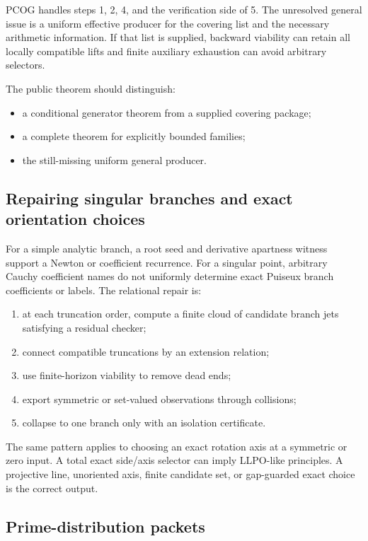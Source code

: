 PCOG handles steps 1, 2, 4, and the verification side of 5.  The unresolved
general issue is a uniform effective producer for the covering list and the
necessary arithmetic information.  If that list is supplied, backward
viability can retain all locally compatible lifts and finite auxiliary
exhaustion can avoid arbitrary selectors.

The public theorem should distinguish:
\begin{itemize}
\item a conditional generator theorem from a supplied covering package;
\item a complete theorem for explicitly bounded families;
\item the still-missing uniform general producer.
\end{itemize}

\subsection{Repairing singular branches and exact orientation choices}

For a simple analytic branch, a root seed and derivative apartness witness
support a Newton or coefficient recurrence.  For a singular point, arbitrary
Cauchy coefficient names do not uniformly determine exact Puiseux branch
coefficients or labels.  The relational repair is:

\begin{enumerate}
\item at each truncation order, compute a finite cloud of candidate branch
jets satisfying a residual checker;
\item connect compatible truncations by an extension relation;
\item use finite-horizon viability to remove dead ends;
\item export symmetric or set-valued observations through collisions;
\item collapse to one branch only with an isolation certificate.
\end{enumerate}

The same pattern applies to choosing an exact rotation axis at a symmetric or
zero input.  A total exact side/axis selector can imply LLPO-like principles.
A projective line, unoriented axis, finite candidate set, or gap-guarded exact
choice is the correct output.

\subsection{Prime-distribution packets}

